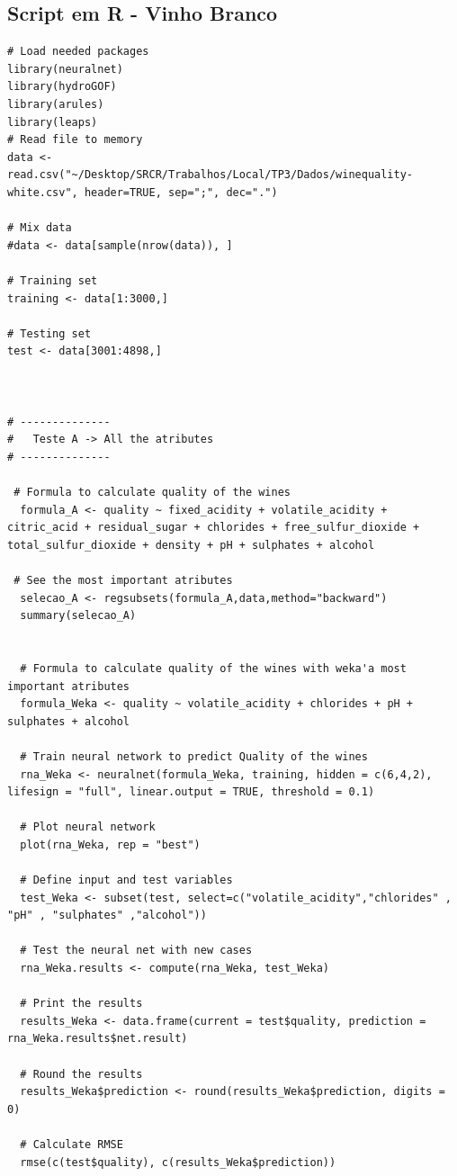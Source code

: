 \documentclass{report}
\begin{document}
\subsection{Script em R - Vinho Branco}
\begin{verbatim}
# Load needed packages
library(neuralnet)
library(hydroGOF)
library(arules)
library(leaps)
# Read file to memory
data <- read.csv("~/Desktop/SRCR/Trabalhos/Local/TP3/Dados/winequality-white.csv", header=TRUE, sep=";", dec=".")

# Mix data
#data <- data[sample(nrow(data)), ]

# Training set
training <- data[1:3000,]

# Testing set
test <- data[3001:4898,]



# --------------
#	Teste A	-> All the atributes	
# --------------

 # Formula to calculate quality of the wines 
  formula_A <- quality ~ fixed_acidity + volatile_acidity + citric_acid + residual_sugar + chlorides + free_sulfur_dioxide + total_sulfur_dioxide + density + pH + sulphates + alcohol
 
 # See the most important atributes
  selecao_A <- regsubsets(formula_A,data,method="backward")
  summary(selecao_A)
  
  
  # Formula to calculate quality of the wines with weka'a most important atributes
  formula_Weka <- quality ~ volatile_acidity + chlorides + pH + sulphates + alcohol
  
  # Train neural network to predict Quality of the wines
  rna_Weka <- neuralnet(formula_Weka, training, hidden = c(6,4,2), lifesign = "full", linear.output = TRUE, threshold = 0.1)
  
  # Plot neural network
  plot(rna_Weka, rep = "best")
  
  # Define input and test variables
  test_Weka <- subset(test, select=c("volatile_acidity","chlorides" , "pH" , "sulphates" ,"alcohol"))
  
  # Test the neural net with new cases
  rna_Weka.results <- compute(rna_Weka, test_Weka)
  
  # Print the results
  results_Weka <- data.frame(current = test$quality, prediction = rna_Weka.results$net.result)
  
  # Round the results
  results_Weka$prediction <- round(results_Weka$prediction, digits = 0)
  
  # Calculate RMSE
  rmse(c(test$quality), c(results_Weka$prediction))
  

\end{verbatim}
\end{document}
